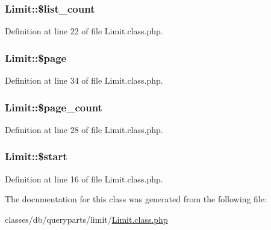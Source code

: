 \subsubsection[{\texorpdfstring{\$list\+\_\+count}{$list_count}}]{\setlength{\rightskip}{0pt plus 5cm}Limit\+::\$list\+\_\+count}\hypertarget{classLimit_ada4e47bcb26e48b38e5a6eae0c66cf9c}{}\label{classLimit_ada4e47bcb26e48b38e5a6eae0c66cf9c}


Definition at line 22 of file Limit.\+class.\+php.

\subsubsection[{\texorpdfstring{\$page}{$page}}]{\setlength{\rightskip}{0pt plus 5cm}Limit\+::\$page}\hypertarget{classLimit_a4018b14c795cefed6f16b6651ca343dc}{}\label{classLimit_a4018b14c795cefed6f16b6651ca343dc}


Definition at line 34 of file Limit.\+class.\+php.

\subsubsection[{\texorpdfstring{\$page\+\_\+count}{$page_count}}]{\setlength{\rightskip}{0pt plus 5cm}Limit\+::\$page\+\_\+count}\hypertarget{classLimit_a4e9d12866f8d59589273aaf8e50eaccd}{}\label{classLimit_a4e9d12866f8d59589273aaf8e50eaccd}


Definition at line 28 of file Limit.\+class.\+php.

\subsubsection[{\texorpdfstring{\$start}{$start}}]{\setlength{\rightskip}{0pt plus 5cm}Limit\+::\$start}\hypertarget{classLimit_a58e5f9abf39a412a992c922b3342d093}{}\label{classLimit_a58e5f9abf39a412a992c922b3342d093}


Definition at line 16 of file Limit.\+class.\+php.



The documentation for this class was generated from the following file\+:\begin{DoxyCompactItemize}
\item 
classes/db/queryparts/limit/\hyperlink{Limit_8class_8php}{Limit.\+class.\+php}\end{DoxyCompactItemize}
